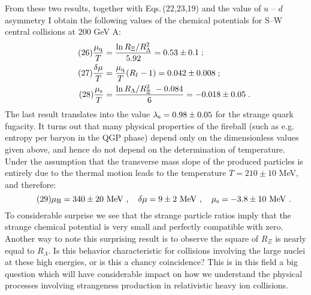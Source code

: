 \begin{mdframed}[linecolor=gray,roundcorner=12pt,backgroundcolor=Dandelion!15,linewidth=1pt,leftmargin=0cm,rightmargin=0cm,topline=true,bottomline=true,skipabove=12pt]
From these two results, together with
Eqs.\,(22,23,19) and the value of $u$ -- $d$
asymmetry I obtain the following values of the chemical potentials for
S--W central collisions at 200 GeV A:
\begin{align*}%
\tag{26} {\mu_{\rm q}\over T} & = {\ln R_\Xi/R_\Lambda^2 \over 5.92}
    = 0.53 \pm 0.1\;;\\ 
\tag{27} {\delta\mu\over T} & = {\mu_{\rm q}\over T}(R_{\rm f}-1)
    = 0.042 \pm 0.008\;;\\
\tag{28}{\mu_{\rm s}\over T} & = {\ln R_\Lambda/R_\Xi^2\ -0.084\over 6}
    = -0.018 \pm 0.05\;.
 \end{align*}
The last result translates into the value $\lambda_{\rm s} = 0.98 \pm
0.05$ for the strange quark fugacity. It turns out that many physical
properties of the fireball (such as e.g. entropy per baryon in the QGP
phase) depend only on the dimensionless values given above, and hence do
not depend on the determination of temperature. Under the assumption that
the transverse mass slope of the produced particles is entirely due to
the thermal motion leads to the temperature $T=210\pm10$ MeV, and
therefore:
\begin{equation} 
\tag{29} \mu_{\rm B} = 340 \pm 20 \mbox{ MeV}\ ,\quad 
 \delta\mu = 9 \pm 2 \mbox{ MeV}\ ,\quad 
 \mu_{\rm s} = -3.8 \pm 10 \mbox{ MeV}\ .
\end{equation} 
To considerable surprise we see that the strange particle ratios imply
that the strange chemical potential is very small and perfectly
compatible with zero. Another way to note this surprising result is to
observe the square of $R_\Xi$ is nearly equal to $R_\Lambda$. Is this
behavior characteristic for collisions involving the large nuclei at
these high energies, or is this a chancy coincidence? This is in this
field a big question which will have considerable impact on how we
understand the physical processes involving strangeness production in
relativistic heavy ion collisions.
 

\end{mdframed}

